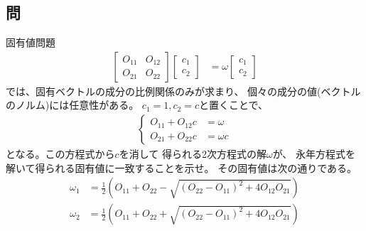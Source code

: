 
\subsection{問}
固有値問題
\begin{align}
	\left[
	\begin{array}{cc}
		O_{11} & O_{12} \\
		O_{21} & O_{22}
	\end{array}
	\right]
		\left[
		\begin{array}{c}
			c_1 \\ c_2
		\end{array}
		\right]
&=
	\omega
		\left[
		\begin{array}{c}
			c_1 \\ c_2
		\end{array}
		\right]
\end{align}
では、固有ベクトルの成分の比例関係のみが求まり、
個々の成分の値(ベクトルのノルム)には任意性がある。
$c_1=1,c_2=c$と置くことで、
\begin{align}
	\left\{
	\begin{array}{rl}
			O_{11} +O_{12}c
		&=
			\omega \\
			O_{21} +O_{22}c
		&=
			\omega c
	\end{array}
	\right.
\end{align}
となる。この方程式から$c$を消して
得られる2次方程式の解$\omega$が、
永年方程式を解いて得られる固有値に一致することを示せ。
その固有値は次の通りである。
\begin{align}
	\omega_1
&=
	\frac{1}{2}
		\left(
			O_{11}
			+
			O_{22}
			-
			\sqrt{
				(O_{22}-O_{11})^2
				+
				4 O_{12} O_{21}
			}
		\right) \\
%
%
	\omega_2
&=
	\frac{1}{2}
		\left(
			O_{11}
			+
			O_{22}
			+
			\sqrt{
				(O_{22}-O_{11})^2
				+
				4 O_{12} O_{21}
			}
		\right)
\end{align}


